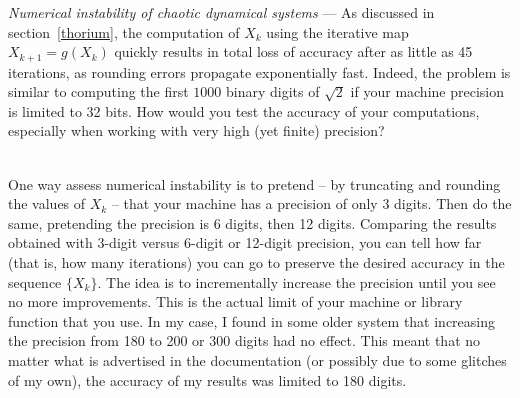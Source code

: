 \documentclass[oneside,10pt]{book}
\begin{document}
\begin{Exercise} \label{exensd}{\em Numerical instability of chaotic dynamical systems} --- As discussed in section~\ref{thorium}, the computation
 of $X_k$ using the iterative map $X_{k+1}=g(X_k)$ quickly results in total loss of accuracy after as little as 45 iterations, as rounding errors propagate exponentially fast. Indeed, the problem is similar to computing the first $1000$ binary digits of $\sqrt{2}$ if your machine precision is limited to 32 bits. How would you test the accuracy of your computations, especially when working with very high (yet finite) precision? 
\vspace{1ex}

 \\
One way assess \textcolor{index}{numerical instability} is to pretend -- by truncating and rounding the values of $X_k$ -- that your machine has a precision of only 3 digits. Then do the same, pretending the precision is 6 digits, then 12 digits. Comparing the results obtained with 3-digit versus 6-digit or 12-digit precision, you can tell how far (that is, how many iterations) you can go to preserve the desired accuracy in the sequence $\{X_k\}$. The idea is to incrementally increase the precision until you see no more improvements. This is the actual limit of your machine or library function that you use. In my case, I found in some older system that increasing the precision from 180 to 200 or 300 digits had no effect. This meant that no matter what is advertised in the documentation (or possibly due to some glitches of my own), the accuracy of my results was limited to 180 digits.
\end{Exercise}
\end{document}
